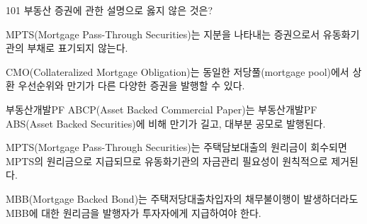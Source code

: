 \begin{question}{101}
부동산 증권에 관한 설명으로 옳지 않은 것은?
\begin{choices}
  \item MPTS(Mortgage Pass-Through Securities)는 지분을 나타내는 증권으로서 유동화기관의 부채로 표기되지 않는다.
  \item CMO(Collateralized Mortgage Obligation)는 동일한 저당풀(mortgage pool)에서 상환 우선순위와 만기가 다른 다양한 증권을 발행할 수 있다.
  \item 부동산개발PF ABCP(Asset Backed Commercial Paper)는 부동산개발PF ABS(Asset Backed Securities)에 비해 만기가 길고, 대부분 공모로 발행된다.
  \item MPTS(Mortgage Pass-Through Securities)는 주택담보대출의 원리금이 회수되면 MPTS의 원리금으로 지급되므로 유동화기관의 자금관리 필요성이 원칙적으로 제거된다.
  \item MBB(Mortgage Backed Bond)는 주택저당대출차입자의 채무불이행이 발생하더라도 MBB에 대한 원리금을 발행자가 투자자에게 지급하여야 한다.
\end{choices}
\end{question}
